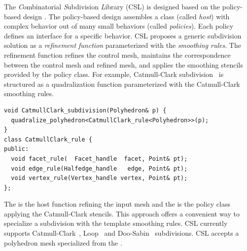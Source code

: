 \documentclass[twocolumn]{article}
\begin{document}
The \emph{C}ombinatorial \emph{S}ubdivision \emph{L}ibrary 
(CSL) is designed based on the policy-based design 
\cite{Alexandrescu:2001:MCD}.
The policy-based design assembles a class
(called \emph{host}) with complex behavior out of many 
small behaviors (called \emph{policies}).
Each policy defines an interface for a
specific behavior. CSL proposes a 
generic subdivision solution as a \emph{refinement function}
parameterized with the \emph{smoothing rules}.
The refinement function refines the control mesh,
maintains the correspondence between the control mesh and refined
mesh, and applies the smoothing stencils provided by the policy
class. For example, Catmull-Clark subdivision~\cite{cc} is structured
as a quadralization function parameterized with the Catmull-Clark
smoothing rules.
\begin{lstlisting}
void CatmullClark_subdivision(Polyhedron& p) {    
  quadralize_polyhedron<CatmullClark_rule<Polyhedron>>(p);  
}
class CatmullClark_rule {
public:
  void facet_rule(  Facet_handle  facet, Point& pt);
  void edge_rule(Halfedge_handle   edge, Point& pt);
  void vertex_rule(Vertex_handle vertex, Point& pt);
};
\end{lstlisting}

\noindent The  
is the host function refining the input mesh
and the  is the policy 
class applying the Catmull-Clark stencils.
This approach offers a convenient way to
specialize a subdivision with the template smoothing rules.
CSL currently supports Catmull-Clark~\cite{cc}, 
Loop~\cite{loop} and Doo-Sabin~\cite{ds} subdivisions.
CSL accepts a polyhedron mesh specialized from the
\cgalpoly .  


{\footnotesize


}
\end{document}
